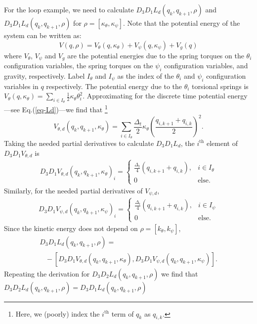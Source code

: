 \documentclass[letterpaper, 10pt, conference]{ieeeconf}
\begin{document}
For the loop example, we need to calculate $D_3D_1L_d(q_k,q_{k+1},\rho)$ and $D_3D_1L_d(q_k,q_{k+1},\rho)$ for $\rho = [\kappa_\theta, \kappa_\psi]$.  Note that the potential energy of the system can be written as:
\[
V(q,\rho) = V_{\theta}(q,\kappa_{\theta}) + V_{\psi}(q,\kappa_{\psi}) + V_g(q)
\]
where $V_{\theta}$, $V_{\psi}$ and $V_g$ are the potential energies due to the spring torques on the $\theta_i$ configuration variables, the spring torques on the $\psi_i$ configuration variables, and gravity, respectively.  Label $I_\theta$ and $I_\psi$ as the index of the $\theta_i$ and $\psi_i$ configuration variables in $q$ respectively. The potential energy due to the $\theta_i$ torsional springs is $V_{\theta}(q, \kappa_{\theta}) = \sum_{i\in I_\theta}\frac{1}{2}\kappa_{\theta}\theta_i^2$.  Approximating for the discrete time potential energy---see Eq.(\ref{eq-Ld})---we find that \footnote{Here, we (poorly) index the $i^\textrm{th}$ term of $q_k$ as $q_{i,k}$.}
\[
V_{\theta,d}(q_k,q_{k+1},\kappa_{\theta}) = \sum_{i \in I_\theta}\frac{\Delta_t}{2}\kappa_{\theta}(\frac{q_{i,k+1} + q_{i,k}}{2})^2.
\]
Taking the needed partial derivatives to calculate $D_3D_1L_d$, the $i^\textrm{th}$ element of $D_3D_1V_{\theta,d}$ is
\[
\begin{array}{l}
D_3D_1 V_{\theta,d}(q_k,q_{k+1},\kappa_{\theta})_i 
= \left\{\begin{array}{ll}
\frac{\Delta_t}{4}(q_{i,k+1} + q_{i,k}),   &     i\in I_\theta \\
0 & \textrm{else}.
\end{array}\right.
\end{array}
\]
Similarly, for the needed partial derivatives of $V_{\psi,d}$,
\[
\begin{array}{l}
D_3D_1 V_{\psi,d}(q_k,q_{k+1},\kappa_{\psi})_i 
= \left\{\begin{array}{ll}
\frac{\Delta_t}{4}(q_{i,k+1} + q_{i,k}),   &     i\in I_\psi \\
0 & \textrm{else}.
\end{array}\right.
\end{array}
\] 
Since the kinetic energy does not depend on $\rho = [k_\theta, k_\psi]$,
\[
\begin{array}{l}
D_3D_1L_d(q_k,q_{k+1},\rho) = \\\hspace{10pt}- [D_3D_1 V_{\theta,d}(q_k,q_{k+1},\kappa_{\theta}), D_3D_1 V_{\psi,d}(q_k,q_{k+1},\kappa_{\psi})].
\end{array}
\]
Repeating the derivation for $D_3D_2L_d(q_k,q_{k+1},\rho)$ we find that $D_3D_2L_d(q_k,q_{k+1},\rho) = D_3D_1L_d(q_k,q_{k+1},\rho)$
\end{document}
